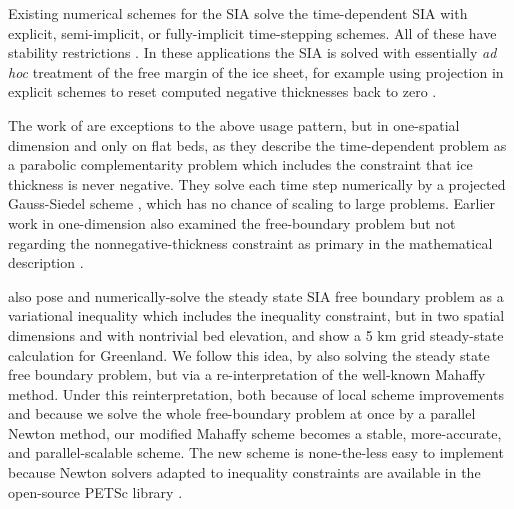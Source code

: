 \documentclass[twocolumn,letterpaper]{igs}
\begin{document}
Existing numerical schemes for the SIA solve the time-dependent SIA with explicit, semi-implicit, or fully-implicit time-stepping schemes.  All of these have stability restrictions \citep[among others]{Bueleretal2005,EgholmNielsen2010,HindmarshPayne1996,Huybrechtsetal1996,
JaroschSchoofAnslow2013}.  In these applications the SIA is solved with essentially \emph{ad hoc} treatment of the free margin of the ice sheet, for example using projection in explicit schemes to reset computed negative thicknesses back to zero \citep{Bueleretal2005,JaroschSchoofAnslow2013}.

The work of \cite{CalvoDuranyVazquez2000,Vazquezetal2003} are exceptions to the above usage pattern, but in one-spatial dimension and only on flat beds, as they describe the time-dependent problem as a parabolic complementarity problem which includes the constraint that ice thickness is never negative.  They solve each time step numerically by a projected Gauss-Siedel scheme \citep{Ciarlet2002}, which has no chance of scaling to large problems.  Earlier work in one-dimension also examined the free-boundary problem but not regarding the nonnegative-thickness constraint as primary in the mathematical description \citep{Hindmarshetal1987,HindmarshHutter1988}.

\cite{JouvetBueler2012} also pose and numerically-solve the steady state SIA free boundary problem as a variational inequality \citep{KinderlehrerStampacchia1980} which includes the inequality constraint, but in two spatial dimensions and with nontrivial bed elevation, and show a 5 km grid steady-state calculation for Greenland.  We follow this idea, by also solving the steady state free boundary problem, but via a re-interpretation of the well-known Mahaffy method.  Under this reinterpretation, both because of local scheme improvements and because we solve the whole free-boundary problem at once by a parallel Newton method, our modified Mahaffy scheme becomes a stable, more-accurate, and parallel-scalable scheme.  The new scheme is none-the-less easy to implement because Newton solvers adapted to inequality constraints \citep{BensonMunson2006} are available in the open-source PETSc library \citep{Balayetal2014}.
\end{document}
